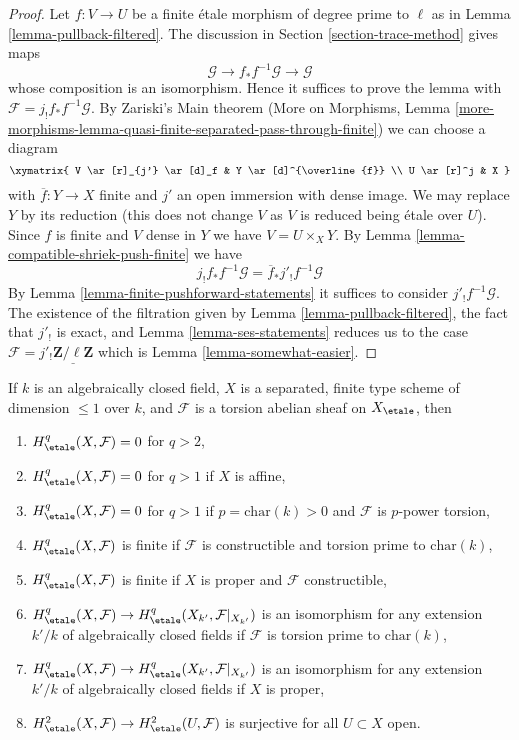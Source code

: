 \begin{proof}
Let $f : V \to U$ be a finite \'etale morphism of degree prime to $\ell$
as in Lemma \ref{lemma-pullback-filtered}. The discussion in
Section \ref{section-trace-method} gives maps
$$
\mathcal{G} \to f_*f^{-1}\mathcal{G} \to \mathcal{G}
$$
whose composition is an isomorphism. Hence it suffices to prove the
lemma with $\mathcal{F} = j_!f_*f^{-1}\mathcal{G}$.
By Zariski's Main theorem
(More on Morphisms, Lemma
\ref{more-morphisms-lemma-quasi-finite-separated-pass-through-finite})
we can choose a diagram
$$
\xymatrix{
V \ar[r]_{j'} \ar[d]_f & Y \ar[d]^{\overline{f}} \\
U \ar[r]^j & X
}
$$
with $\overline{f} : Y \to X$ finite and $j'$ an open immersion
with dense image. We may replace $Y$ by its reduction (this does
not change $V$ as $V$ is reduced being \'etale over $U$).
Since $f$ is finite and $V$ dense in $Y$ we have $V = U \times_X Y$. By
Lemma \ref{lemma-compatible-shriek-push-finite} we have
$$
j_!f_*f^{-1}\mathcal{G} = \overline{f}_*j'_!f^{-1}\mathcal{G}
$$
By Lemma \ref{lemma-finite-pushforward-statements} it suffices to
consider $j'_!f^{-1}\mathcal{G}$.
The existence of the filtration given by
Lemma \ref{lemma-pullback-filtered},
the fact that $j'_!$ is exact, and
Lemma \ref{lemma-ses-statements}
reduces us to the case
$\mathcal{F} = j'_!\underline{\mathbf{Z}/\ell\mathbf{Z}}$
which is Lemma \ref{lemma-somewhat-easier}.
\end{proof}



\begin{theorem}
\label{theorem-vanishing-affine-curves}
If $k$ is an algebraically closed field, $X$ is a separated, finite type
scheme of dimension $\leq 1$ over $k$, and $\mathcal{F}$ is a torsion
abelian sheaf on $X_\etale$, then
\begin{enumerate}
\item
$H^q_\etale(X, \mathcal{F}) = 0$ for $q > 2$,
\item
$H^q_\etale(X, \mathcal{F}) = 0$ for $q > 1$ if $X$ is affine,
\item
$H^q_\etale(X, \mathcal{F}) = 0$ for $q > 1$ if $p = \text{char}(k) > 0$
and $\mathcal{F}$ is $p$-power torsion,
\item
$H^q_\etale(X, \mathcal{F})$ is finite if $\mathcal{F}$ is
constructible and torsion prime to $\text{char}(k)$,
\item
$H^q_\etale(X, \mathcal{F})$ is finite if $X$ is proper and
$\mathcal{F}$ constructible,
\item
$H^q_\etale(X, \mathcal{F}) \to
H^q_\etale(X_{k'}, \mathcal{F}|_{X_{k'}})$ is an isomorphism
for any extension $k'/k$ of algebraically closed fields
if $\mathcal{F}$ is torsion prime to $\text{char}(k)$,
\item
$H^q_\etale(X, \mathcal{F}) \to
H^q_\etale(X_{k'}, \mathcal{F}|_{X_{k'}})$ is an isomorphism
for any extension $k'/k$ of algebraically closed fields
if $X$ is proper,
\item
$H^2_\etale(X, \mathcal{F}) \to H^2_\etale(U, \mathcal{F})$
is surjective for all $U \subset X$ open.
\end{enumerate}
\end{theorem}

